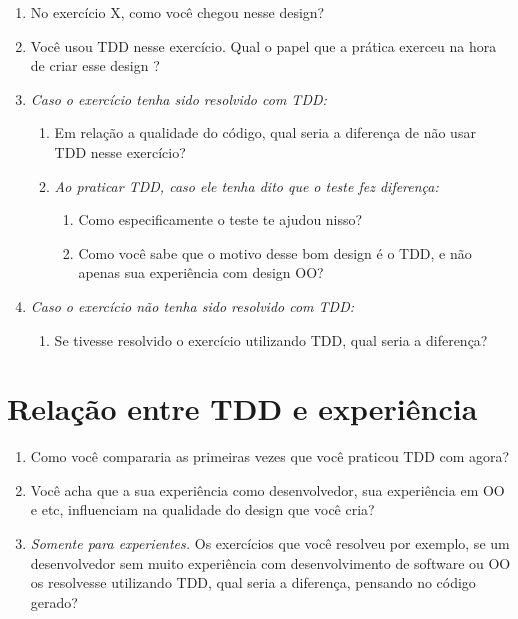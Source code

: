 \begin{enumerate}
	
	\item No exercício X, como você chegou nesse design? 

	\item Você usou TDD nesse exercício. Qual o papel que a prática exerceu na hora de criar esse design ?

	\item \textit{Caso o exercício tenha sido resolvido com TDD:}
		\begin{enumerate}
			\item Em relação a qualidade do código, qual seria a diferença de não usar TDD nesse exercício?
		
			\item \textit{Ao praticar TDD, caso ele tenha dito que o teste fez diferença:}
				\begin{enumerate}
					\item Como especificamente o teste te ajudou nisso?
	
					\item Como você sabe que o motivo desse bom design é o TDD, e não apenas sua experiência
					com design OO?
				\end{enumerate}
		\end{enumerate}
		
	\item \textit{Caso o exercício não tenha sido resolvido com TDD:}
		\begin{enumerate}
			\item Se tivesse resolvido o exercício utilizando TDD, qual seria a diferença?
		\end{enumerate}

\end{enumerate}

\section{Relação entre TDD e experiência}

\begin{enumerate}
	\item Como você compararia as primeiras vezes que você praticou TDD com agora?

	\item Você acha que a sua experiência como desenvolvedor, sua experiência em OO e etc,
	influenciam na qualidade do design que você cria?

	\item \textit{Somente para experientes.} Os exercícios que você resolveu por exemplo, se um desenvolvedor
	sem muito experiência com desenvolvimento de software ou OO os resolvesse utilizando TDD, qual seria a diferença,
	pensando no código gerado?

\end{enumerate}

